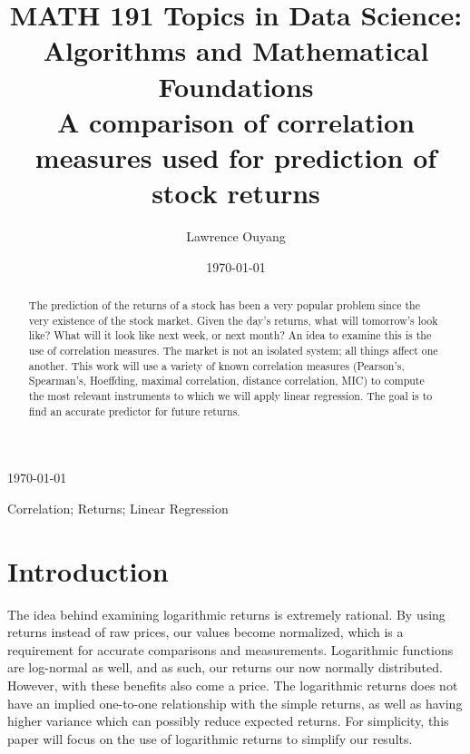 \documentclass[10pt]{siamltex}
\begin{document}
\title{MATH 191 Topics in Data Science: \\ Algorithms and Mathematical Foundations \\ A comparison of correlation measures used for prediction of stock returns }
\author{Lawrence Ouyang}
\date{\today}
\maketitle

\begin{center}
     \today
\end{center}

\vspace{5mm}

\begin{abstract}
The prediction of the returns of a stock has been a very popular problem since the very existence of the stock market. Given the day's returns, what will tomorrow's look like? What will it look like next week, or next month? An idea to examine this is the use of correlation measures. The market is not an isolated system; all things affect one another. This work will use a variety of known correlation measures (Pearson's, Spearman's, Hoeffding, maximal correlation, distance correlation, MIC) to compute the most relevant instruments to which we will apply linear regression. The goal is to find an accurate predictor for future returns. 
\end{abstract}


\begin{keywords} Correlation; Returns; Linear Regression
\end{keywords}


\section{Introduction}

The idea behind examining logarithmic returns is extremely rational. By using returns instead of raw prices, our values become normalized, which is a requirement for accurate comparisons and measurements. Logarithmic functions are log-normal as well, and as such, our returns our now normally distributed. However, with these benefits also come a price. The logarithmic returns does not have an implied one-to-one relationship with the simple returns, as well as having higher variance which can possibly reduce expected returns\cite{CompLogSimRet}. For simplicity, this paper will focus on the use of logarithmic returns to simplify our results.
\end{document}

